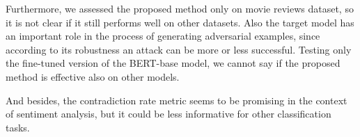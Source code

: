 Furthermore, we assessed the proposed method only on movie reviews dataset, so it is not clear if it still performs well on other datasets.
Also the target model has an important role in the process of generating adversarial examples, since according to its robustness an attack can be more or less successful. Testing only the fine-tuned version of the BERT-base model, we cannot say if the proposed method is effective also on other models.

And besides, the contradiction rate metric seems to be promising in the context of sentiment analysis, but it could be less informative for other classification tasks.